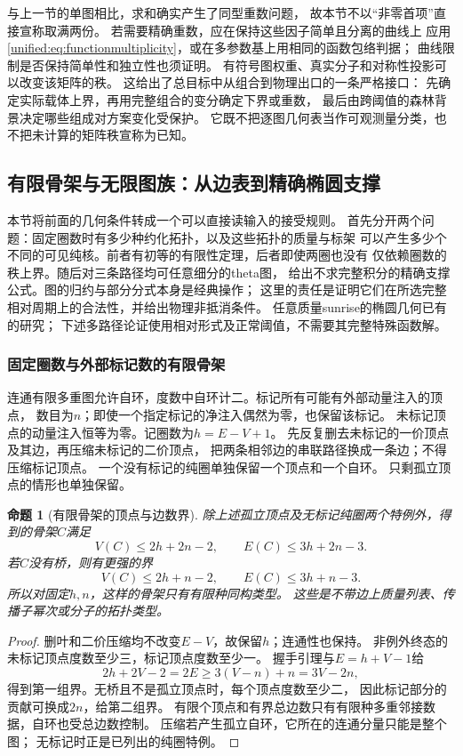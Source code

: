 \documentclass[11pt,a4paper,oneside]{ctexart}
\theoremstyle{cnplain}
\newtheorem{proposition}[theorem]{命题}
\theoremstyle{definition}
\theoremstyle{remark}
\numberwithin{equation}{section}
\begin{document}
与上一节的单图相比，求和确实产生了同型重数问题，
故本节不以“非零首项”直接宣称取满两份。
若需要精确重数，应在保持这些因子简单且分离的曲线上
应用\eqref{unified:eq:functionmultiplicity}，或在多参数基上用相同的函数包络判据；
曲线限制是否保持简单性和独立性也须证明。
有符号图权重、真实分子和对称性投影可以改变该矩阵的秩。
这给出了总目标中从组合到物理出口的一条严格接口：
先确定实际载体上界，再用完整组合的变分确定下界或重数，
最后由跨阈值的森林背景决定哪些组成对方案变化受保护。
它既不把逐图几何表当作可观测量分类，也不把未计算的矩阵秩宣称为已知。



\subsection{有限骨架与无限图族：从边表到精确椭圆支撑}
\label{unified:sec:finitecores}
本节将前面的几何条件转成一个可以直接读输入的接受规则。
首先分开两个问题：固定圈数时有多少种约化拓扑，以及这些拓扑的质量与标架
可以产生多少个不同的可见纯核。前者有初等的有限性定理，后者即使两圈也没有
仅依赖圈数的秩上界。随后对三条路径均可任意细分的theta图，
给出不求完整积分的精确支撑公式。图的归约与部分分式本身是经典操作；
这里的责任是证明它们在所选完整相对周期上的合法性，并给出物理非抵消条件。
任意质量sunrise的椭圆几何已有\cite{abwsun,bkvsunset}的研究；
下述多路径论证使用相对形式及正常阈值，不需要其完整特殊函数解。

\subsubsection{固定圈数与外部标记数的有限骨架}
连通有限多重图允许自环，度数中自环计二。标记所有可能有外部动量注入的顶点，
数目为$n$；即使一个指定标记的净注入偶然为零，也保留该标记。
未标记顶点的动量注入恒等为零。记圈数为$h=E-V+1$。
先反复删去未标记的一价顶点及其边，再压缩未标记的二价顶点，
把两条相邻边的串联路径换成一条边；不得压缩标记顶点。
一个没有标记的纯圈单独保留一个顶点和一个自环。
只剩孤立顶点的情形也单独保留。

\begin{proposition}[有限骨架的顶点与边数界]\label{unified:prop:finitecore}
除上述孤立顶点及无标记纯圈两个特例外，得到的骨架$C$满足
\[
 V(C)\le 2h+2n-2,\qquad E(C)\le 3h+2n-3.
\]
若$C$没有桥，则有更强的界
\[
 V(C)\le 2h+n-2,\qquad E(C)\le 3h+n-3.
\]
所以对固定$h,n$，这样的骨架只有有限种同构类型。
这些是不带边上质量列表、传播子幂次或分子的拓扑类型。
\end{proposition}
\begin{proof}
删叶和二价压缩均不改变$E-V$，故保留$h$；连通性也保持。
非例外终态的未标记顶点度数至少三，标记顶点度数至少一。
握手引理与$E=h+V-1$给
\[
 2h+2V-2=2E\ge3(V-n)+n=3V-2n,
\]
得到第一组界。无桥且不是孤立顶点时，每个顶点度数至少二，
因此标记部分的贡献可换成$2n$，给第二组界。
有限个顶点和有界总边数只有有限种多重邻接数据，自环也受总边数控制。
压缩若产生孤立自环，它所在的连通分量只能是整个图；
无标记时正是已列出的纯圈特例。
\end{proof}
\end{document}
